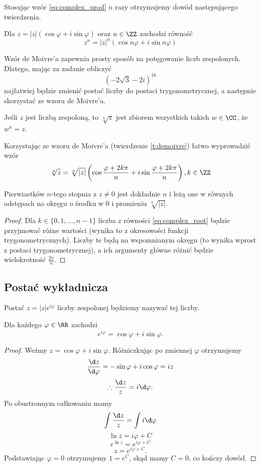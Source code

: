 Stosując wzór \ref{eq:complex_prod} $n$ razy otrzymujemy dowód następującego twierdzenia.

\begin{theorem}
    \label{t:demoivre}
    Dla $z = |z|(\cos\varphi + i\sin\varphi)$ oraz $n \in \ZZ$ zachodzi równość
    $$ z^n = |z|^n(\cos n\varphi + i\sin n\varphi) $$
\end{theorem}

Wzór de Moivre'a zapewnia prosty sposób na potęgowanie liczb zespolonych. Dlatego, mając za zadanie obliczyć
$$ (-2\sqrt{3} - 2i)^{16} $$
najłatwiej będzie zmienić postać liczby do postaci trygonometrycznej, a następnie skorzystać ze wzoru de Moivre'a.

\begin{definition}
    Jeśli $z$ jest liczbą zespoloną, to $\sqrt[n]{z}$ jest zbiorem wszystkich takich $w \in \CC$, że $w^n = z$.
\end{definition}

Korzystając ze wzoru de Moivre'a (twierdzenie \ref{t:demoivre}) łatwo wyprowadzić wzór
\begin{equation}
    \label{eq:complex_root}
    \sqrt[n]{z} = \sqrt[n]{|z|}\left(\cos\frac{\varphi + 2k\pi}{n} + i\sin\frac{\varphi + 2k\pi}{n}\right), k \in \ZZ
\end{equation}

\begin{fact}
    Pierwiastków $n$-tego stopnia z $z \neq 0$ jest dokładnie $n$ i leżą one w równych odstępach na okręgu o środku w $0$ i promieniu $\sqrt[n]{|z|}$.
\end{fact}
\begin{proof}
    Dla $k \in \{0, 1, \ldots, n-1\}$ liczba z równości \ref{eq:complex_root} będzie przyjmować różne wartości (wynika to z okresowości funkcji trygonometrycznych). Liczby te będą na wspomnianym okręgu (to wynika wprost z postaci trygonometrycznej), a ich argumenty główne różnić będzie wielokrotność $\frac{2\pi}{n}$.
\end{proof}

\subsection{Postać wykładnicza}
Postać $z = |z|e^{i\varphi}$ liczby zespolonej będziemy nazywać  tej liczby.
\begin{theorem}
    Dla każdego $\varphi \in \RR$ zachodzi
    $$ e^{i\varphi} = \cos\varphi + i\sin\varphi. $$
\end{theorem}
\begin{proof}
    Weźmy $z = \cos\varphi + i\sin\varphi$. Różniczkując po zmiennej $\varphi$ otrzymujemy
    $$ \frac{\d z}{\d \varphi} = -\sin\varphi + i\cos\varphi = iz $$
    $$ \therefore \frac{\d z}{z} = i\d\varphi. $$
    Po obustronnym całkowaniu mamy
    $$ \int\frac{\d z}{z} = \int i\d\varphi $$
    $$ \ln{z} = i\varphi + C $$
    $$ e^{\ln{z}} = e^{i\varphi + C} $$
    $$ z = e^{i\varphi + C}. $$
    Podstawiając $\varphi = 0$ otrzymujemy $1 = e^C$, skąd mamy $C = 0$, co kończy dowód.
\end{proof}
